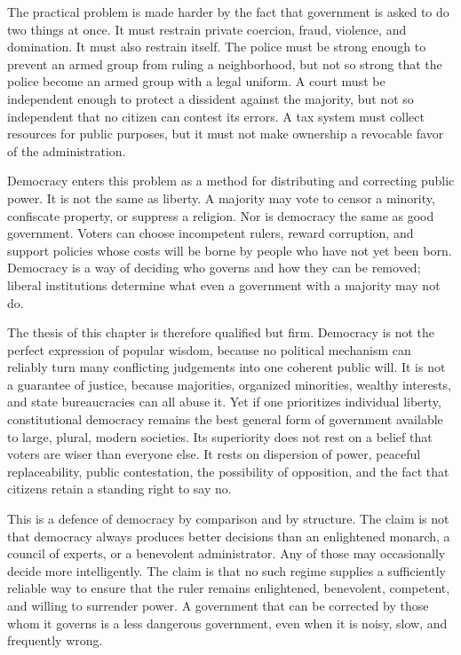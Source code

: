 ﻿\documentclass[12pt,a4paper]{book}
\begin{document}
The practical problem is made harder by the fact that government is asked to
do two things at once.  It must restrain private coercion, fraud, violence,
and domination.  It must also restrain itself.  The police must be strong
enough to prevent an armed group from ruling a neighborhood, but not so
strong that the police become an armed group with a legal uniform.  A court
must be independent enough to protect a dissident against the majority, but
not so independent that no citizen can contest its errors.  A tax system must
collect resources for public purposes, but it must not make ownership a
revocable favor of the administration.

Democracy enters this problem as a method for distributing and correcting
public power.  It is not the same as liberty.  A majority may vote to censor
a minority, confiscate property, or suppress a religion.  Nor is democracy
the same as good government.  Voters can choose incompetent rulers, reward
corruption, and support policies whose costs will be borne by people who
have not yet been born.  Democracy is a way of deciding who governs and how
they can be removed; liberal institutions determine what even a government
with a majority may not do.

The thesis of this chapter is therefore qualified but firm.  Democracy is
not the perfect expression of popular wisdom, because no political mechanism
can reliably turn many conflicting judgements into one coherent public will.
It is not a guarantee of justice, because majorities, organized minorities,
wealthy interests, and state bureaucracies can all abuse it.  Yet if one
prioritizes individual liberty, constitutional democracy remains the best
general form of government available to large, plural, modern societies.
Its superiority does not rest on a belief that voters are wiser than
everyone else.  It rests on dispersion of power, peaceful replaceability,
public contestation, the possibility of opposition, and the fact that
citizens retain a standing right to say no.

This is a defence of democracy by comparison and by structure.  The claim
is not that democracy always produces better decisions than an enlightened
monarch, a council of experts, or a benevolent administrator.  Any of those
may occasionally decide more intelligently.  The claim is that no such
regime supplies a sufficiently reliable way to ensure that the ruler remains
enlightened, benevolent, competent, and willing to surrender power.  A
government that can be corrected by those whom it governs is a less
dangerous government, even when it is noisy, slow, and frequently wrong.
\end{document}
